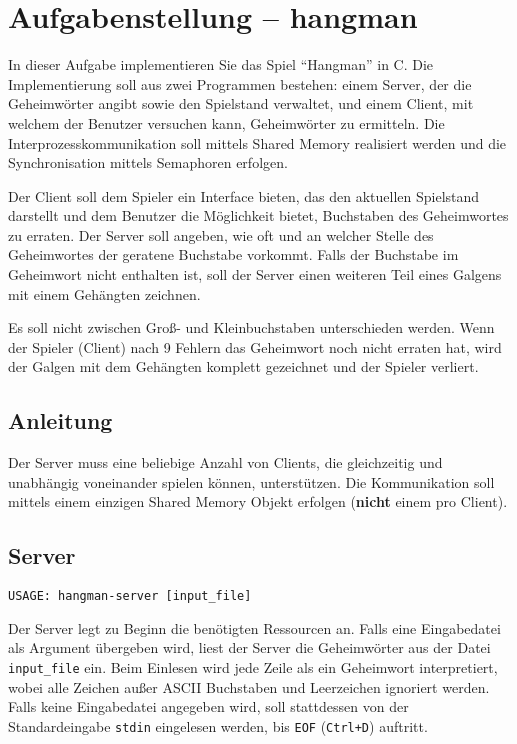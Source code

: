 



\section*{Aufgabenstellung -- hangman}


In dieser Aufgabe implementieren Sie das Spiel "`Hangman"' in C. Die
Implementierung soll aus zwei Programmen bestehen: einem Server, der die
Geheimwörter angibt sowie den Spielstand verwaltet, und einem Client, mit
welchem der Benutzer versuchen kann, Geheimwörter zu ermitteln.  Die
Interprozesskommunikation soll mittels Shared Memory realisiert werden
und die Synchronisation mittels Semaphoren erfolgen.


Der Client soll dem Spieler ein Interface bieten, das den aktuellen Spielstand
darstellt und dem Benutzer die Möglichkeit bietet, Buchstaben des Geheimwortes
zu erraten.  Der Server soll angeben, wie oft und an welcher Stelle des
Geheimwortes der geratene Buchstabe vorkommt. Falls der Buchstabe im Geheimwort
nicht enthalten ist, soll der Server einen weiteren Teil eines Galgens mit
einem Gehängten zeichnen.

Es soll nicht zwischen Groß- und Kleinbuchstaben unterschieden werden. Wenn der
Spieler (Client) nach 9 Fehlern das Geheimwort noch nicht erraten hat, wird der
Galgen mit dem Gehängten komplett gezeichnet und der Spieler verliert.

\subsection*{Anleitung} Der Server muss eine beliebige Anzahl von Clients, die
gleichzeitig und unabhängig voneinander spielen können, unterstützen. Die
Kommunikation soll mittels einem einzigen Shared Memory Objekt erfolgen
(\textbf{nicht} einem pro Client).


\subsection*{Server}

\begin{verbatim}
USAGE: hangman-server [input_file]
\end{verbatim}

Der Server legt zu Beginn die benötigten Ressourcen an. Falls eine Eingabedatei
als Argument übergeben wird, liest der Server die Geheimwörter aus der Datei
\verb|input_file| ein. Beim Einlesen wird jede Zeile als ein Geheimwort
interpretiert, wobei alle Zeichen außer ASCII Buchstaben und Leerzeichen
ignoriert werden. Falls keine Eingabedatei angegeben wird, soll stattdessen
von der Standardeingabe \verb|stdin| eingelesen werden, bis \verb|EOF|
(\verb|Ctrl+D|) auftritt.

